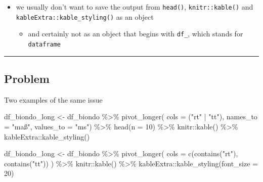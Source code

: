 \documentclass[
  letterpaper,
  DIV=11]{scrartcl}
\newenvironment{Shaded}{\begin{snugshade}}{\end{snugshade}}
\newcommand{\AttributeTok}[1]{\textcolor[rgb]{0.40,0.45,0.13}{#1}}
\newcommand{\DecValTok}[1]{\textcolor[rgb]{0.68,0.00,0.00}{#1}}
\newcommand{\FunctionTok}[1]{\textcolor[rgb]{0.28,0.35,0.67}{#1}}
\newcommand{\NormalTok}[1]{\textcolor[rgb]{0.00,0.23,0.31}{#1}}
\newcommand{\OtherTok}[1]{\textcolor[rgb]{0.00,0.23,0.31}{#1}}
\newcommand{\SpecialCharTok}[1]{\textcolor[rgb]{0.37,0.37,0.37}{#1}}
\newcommand{\StringTok}[1]{\textcolor[rgb]{0.13,0.47,0.30}{#1}}
\providecommand{\tightlist}{%
  \setlength{\itemsep}{0pt}\setlength{\parskip}{0pt}}\usepackage{longtable,booktabs,array}
\begin{document}
\begin{itemize}
\tightlist
\item
  we usually don't want to save the output from \texttt{head()},
  \texttt{knitr::kable()} and \texttt{kableExtra::kable\_styling()} as
  an object

  \begin{itemize}
  \tightlist
  \item
    and certainly not as an object that begins with \texttt{df\_}, which
    stands for \texttt{dataframe}
  \end{itemize}
\end{itemize}

\begin{center}\rule{0.5\linewidth}{0.5pt}\end{center}

\subsection{Problem}

Two examples of the same issue

\begin{Shaded}
\begin{Highlighting}[]
\NormalTok{df\_biondo\_long }\OtherTok{\textless{}{-}}\NormalTok{ df\_biondo }\SpecialCharTok{\%\textgreater{}\%} 
  \FunctionTok{pivot\_longer}\NormalTok{(}
    \AttributeTok{cols =}\NormalTok{ (}\StringTok{"rt"} \SpecialCharTok{|} \StringTok{"tt"}\NormalTok{),}
    \AttributeTok{names\_to =} \StringTok{"maß"}\NormalTok{,}
    \AttributeTok{values\_to =} \StringTok{"ms"}\NormalTok{) }\SpecialCharTok{\%\textgreater{}\%} 
  \FunctionTok{head}\NormalTok{(}\AttributeTok{n =} \DecValTok{10}\NormalTok{) }\SpecialCharTok{\%\textgreater{}\%} 
\NormalTok{  knitr}\SpecialCharTok{::}\FunctionTok{kable}\NormalTok{() }\SpecialCharTok{\%\textgreater{}\%} 
\NormalTok{  kableExtra}\SpecialCharTok{::}\FunctionTok{kable\_styling}\NormalTok{()}
\end{Highlighting}
\end{Shaded}

\begin{Shaded}
\begin{Highlighting}[]
\NormalTok{df\_biondo\_long }\OtherTok{\textless{}{-}}\NormalTok{ df\_biondo }\SpecialCharTok{\%\textgreater{}\%}
  \FunctionTok{pivot\_longer}\NormalTok{(}
    \AttributeTok{cols =} \FunctionTok{c}\NormalTok{(}\FunctionTok{contains}\NormalTok{(}\StringTok{"rt"}\NormalTok{), }\FunctionTok{contains}\NormalTok{(}\StringTok{"tt"}\NormalTok{))}
\NormalTok{  ) }\SpecialCharTok{\%\textgreater{}\%}
\NormalTok{  knitr}\SpecialCharTok{::}\FunctionTok{kable}\NormalTok{() }\SpecialCharTok{\%\textgreater{}\%}
\NormalTok{  kableExtra}\SpecialCharTok{::}\FunctionTok{kable\_styling}\NormalTok{(}\AttributeTok{font\_size =} \DecValTok{20}\NormalTok{)}
\end{Highlighting}
\end{Shaded}
\end{document}
